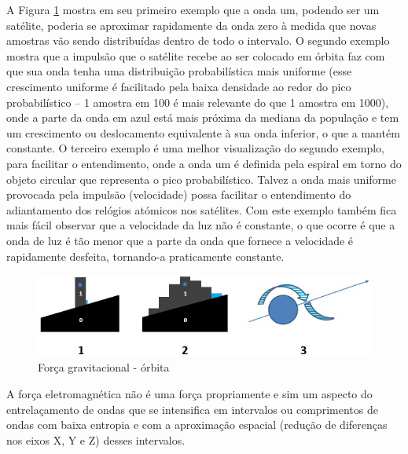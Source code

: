 A Figura \ref{fig:consciousness_gravitational_orbit} mostra em seu primeiro exemplo que a onda um, podendo ser um satélite, poderia se aproximar rapidamente da onda zero à medida que novas amostras vão sendo distribuídas dentro de todo o intervalo. O segundo exemplo mostra que a impulsão que o satélite recebe ao ser colocado em órbita faz com que sua onda tenha uma distribuição probabilística mais uniforme (esse crescimento uniforme é facilitado pela baixa densidade ao redor do pico probabilístico – 1 amostra em 100 é mais relevante do que 1 amostra em 1000), onde a parte da onda em azul está mais próxima da mediana da população e tem um crescimento ou deslocamento equivalente à sua onda inferior, o que a mantém constante. O terceiro exemplo é uma melhor visualização do segundo exemplo, para facilitar o entendimento, onde a onda um é definida pela espiral em torno do objeto circular que representa o pico probabilístico. Talvez a onda mais uniforme provocada pela impulsão (velocidade) possa facilitar o entendimento do adiantamento dos relógios atómicos nos satélites. Com este exemplo também fica mais fácil observar que a velocidade da luz não é constante, o que ocorre é que a onda de luz é tão menor que a parte da onda que fornece a velocidade é rapidamente desfeita, tornando-a praticamente constante.
	\begin{figure}[H]
	\caption{Força gravitacional - órbita}
	\label{fig:consciousness_gravitational_orbit}
	\centering
	\includegraphics[scale=.9]{sections/images/consciousness_gravitational_orbit.jpg}
	\end{figure}

A força eletromagnética não é uma força propriamente e sim um aspecto do entrelaçamento de ondas que se intensifica em intervalos ou comprimentos de ondas com baixa entropia e com a aproximação espacial (redução de diferenças nos eixos X, Y e Z) desses intervalos.

